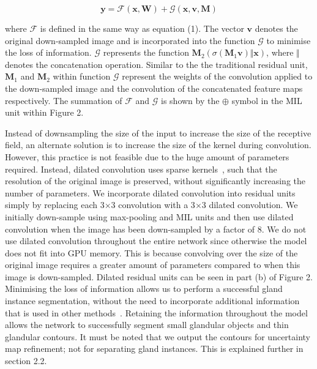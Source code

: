 \documentclass[3p]{elsarticle}
\begin{document}
\begin{equation}
\textbf{y} = \mathcal{F}(\textbf{x} , {\textbf{W}}) + \mathcal{G}(\textbf{x} , \textbf{v}, {\textbf{M}})
\end{equation}

\noindent where $\mathcal{F}$ is defined in the same way as equation (1). The vector $\textbf{v}$ denotes the original down-sampled image and is incorporated into the function $\mathcal{G}$ to minimise the loss of information. $\mathcal{G}$ represents the function  $\textbf{M}_2(\sigma(\textbf{M}_1\textbf{v}) \Vert \textbf{x})$, where $\Vert$ denotes the concatenation operation. Similar to the the traditional residual unit,  $\textbf{M}_1$ and $\textbf{M}_2$ within function $\mathcal{G}$ represent the weights of the convolution applied to the down-sampled image and the convolution of the concatenated feature maps respectively. The summation of $\mathcal{F}$ and $\mathcal{G}$ is shown by the  $\oplus$ symbol in the MIL unit within Figure 2.

Instead of downsampling the size of the input to increase the size of the receptive field, an alternate solution is to increase the size of the kernel during convolution. However, this practice is not feasible due to the huge amount of parameters required. Instead, dilated convolution uses sparse kernels~\citep{yu2015multi}, such that the resolution of the original image is preserved, without significantly increasing the number of parameters. We incorporate dilated convolution into residual units simply by replacing each 3$\times$3 convolution with a 3$\times$3 dilated convolution. We initially down-sample using max-pooling and MIL units and then use dilated convolution when the image has been down-sampled by a factor of 8. We do not use dilated convolution throughout the entire network since otherwise the model does not fit into GPU memory. This is because convolving over the size of the original image requires a greater amount of parameters compared to when this image is down-sampled. Dilated residual units can be seen in part (b) of Figure 2. Minimising the loss of information allows us to perform a successful gland instance segmentation, without the need to incorporate additional information that is used in other methods~\citep{chen2017dcan}. Retaining the information throughout the model allows the network to successfully segment small glandular objects and thin glandular contours. It must be noted that we output the contours for uncertainty map refinement; not for separating gland instances. This is explained further in section 2.2. 
\end{document}
